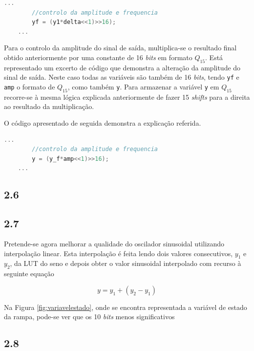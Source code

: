 \documentclass[11pt]{article}
\numberwithin{equation}{section}
\begin{document}
\begin{lstlisting}[language=C]
	...
		//controlo da amplitude e frequencia
		yf = (y1*delta<<1)>>16);
	...
\end{lstlisting}

Para o controlo da amplitude do sinal de saída, multiplica-se o resultado final obtido anteriormente por uma constante de 16 \textit{bits} em formato $Q_{15}$. Está representado um excerto de código que demonstra a alteração da amplitude do sinal de saída. Neste caso todas as variáveis são também de 16 \textit{bits}, tendo \texttt{yf} e \texttt{amp} o formato de $Q_{15}$, como também \texttt{y}. Para armazenar a variável \texttt{y} em $Q_{15}$ recorre-se à mesma lógica explicada anteriormente de fazer 15 \textit{shifts} para a direita ao resultado da multiplicação.

O código apresentado de seguida demonstra a explicação referida.

\begin{lstlisting}[language=C]
	...
		//controlo da amplitude e frequencia
		y = (y_f*amp<<1)>>16);
	...
\end{lstlisting}

\subsection*{2.6} %


\subsection*{2.7} %

Pretende-se agora melhorar a qualidade do oscilador sinusoidal utilizando interpolação linear. Esta interpolação é feita lendo dois valores consecutivos, $y_{1}$ e $y_{2}$, da LUT do seno e depois obter o valor sinusoidal interpolado com recurso à seguinte equação

\vspace{-3mm}
\begin{equation}
y = y_{1} + (y_{2} - y_{1})
\end{equation}

Na Figura \ref{fig:variavelestado}, onde se encontra representada a variável de estado da rampa, pode-se ver que os 10 \textit{bits} menos significativos 


\subsection*{2.8} %
\end{document}
